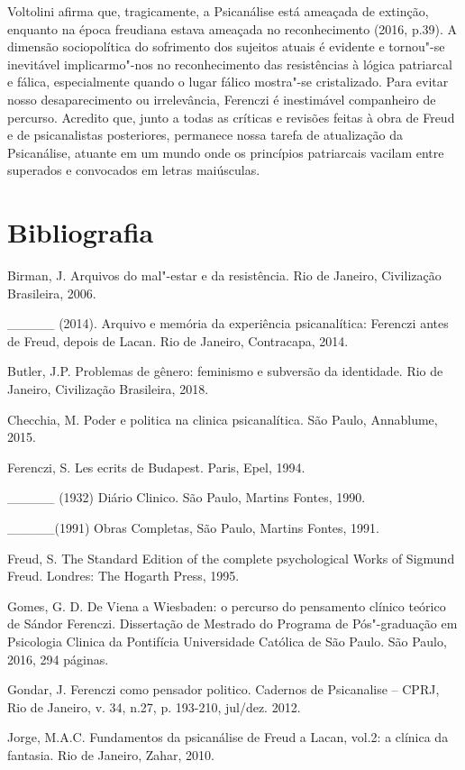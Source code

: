 Voltolini afirma que, tragicamente, a Psicanálise está ameaçada de
extinção, enquanto na época freudiana estava ameaçada no reconhecimento
(2016, p.39). A dimensão sociopolítica do sofrimento dos sujeitos atuais
é evidente e tornou"-se inevitável implicarmo"-nos no reconhecimento das
resistências à lógica patriarcal e fálica, especialmente quando o lugar
fálico mostra"-se cristalizado. Para evitar nosso desaparecimento ou
irrelevância, Ferenczi é inestimável companheiro de percurso. Acredito
que, junto a todas as críticas e revisões feitas à obra de Freud e de
psicanalistas posteriores, permanece nossa tarefa de atualização da
Psicanálise, atuante em um mundo onde os princípios patriarcais vacilam
entre superados e convocados em letras maiúsculas.

\section{Bibliografia}

Birman, J. Arquivos do mal"-estar e da resistência. Rio de Janeiro,
Civilização Brasileira, 2006.

\_\_\_\_\_ (2014). Arquivo e memória da experiência psicanalítica:
Ferenczi antes de Freud, depois de Lacan. Rio de Janeiro, Contracapa,
2014.

Butler, J.P. Problemas de gênero: feminismo e subversão da identidade.
Rio de Janeiro, Civilização Brasileira, 2018.

Checchia, M. Poder e politica na clinica psicanalítica. São Paulo,
Annablume, 2015.

Ferenczi, S. Les ecrits de Budapest. Paris, Epel, 1994.

\_\_\_\_\_ (1932) Diário Clinico. São Paulo, Martins Fontes, 1990.

\_\_\_\_\_(1991) Obras Completas, São Paulo, Martins Fontes, 1991.

Freud, S. The Standard Edition of the complete psychological Works of
Sigmund Freud. Londres: The Hogarth Press, 1995.

Gomes, G. D. De Viena a Wiesbaden: o percurso do pensamento clínico
teórico de Sándor Ferenczi. Dissertação de Mestrado do Programa de
Pós"-graduação em Psicologia Clinica da Pontifícia Universidade Católica
de São Paulo. São Paulo, 2016, 294 páginas.

Gondar, J. Ferenczi como pensador politico. Cadernos de Psicanalise --
CPRJ, Rio de Janeiro, v. 34, n.27, p. 193-210, jul/dez. 2012.

Jorge, M.A.C. Fundamentos da psicanálise de Freud a Lacan, vol.2: a
clínica da fantasia. Rio de Janeiro, Zahar, 2010.

